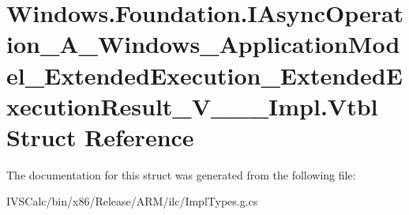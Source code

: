 \hypertarget{struct_windows_1_1_foundation_1_1_i_async_operation___a___windows___application_model___extendedbecb250413ef1d2f03596d4c76013d97}{}\section{Windows.\+Foundation.\+I\+Async\+Operation\+\_\+\+A\+\_\+\+Windows\+\_\+\+Application\+Model\+\_\+\+Extended\+Execution\+\_\+\+Extended\+Execution\+Result\+\_\+\+V\+\_\+\+\_\+\+\_\+\+Impl.\+Vtbl Struct Reference}
\label{struct_windows_1_1_foundation_1_1_i_async_operation___a___windows___application_model___extendedbecb250413ef1d2f03596d4c76013d97}


The documentation for this struct was generated from the following file\+:\begin{DoxyCompactItemize}
\item 
I\+V\+S\+Calc/bin/x86/\+Release/\+A\+R\+M/ilc/Impl\+Types.\+g.\+cs\end{DoxyCompactItemize}
